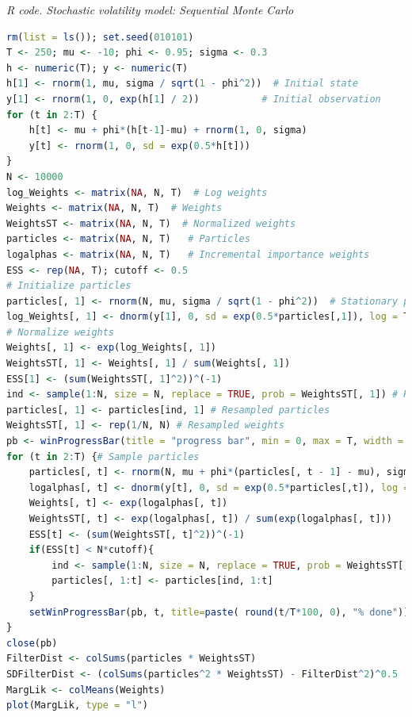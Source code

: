 \begin{enumerate}[leftmargin=*]
\begin{tcolorbox}[enhanced,width=4.67in,center upper,
	fontupper=\large\bfseries,drop shadow southwest,sharp corners]
	\textit{R code. Stochastic volatility model:  Sequential Monte Carlo}
	\begin{VF}
		\begin{lstlisting}[language=R]
rm(list = ls()); set.seed(010101)
T <- 250; mu <- -10; phi <- 0.95; sigma <- 0.3
h <- numeric(T); y <- numeric(T)
h[1] <- rnorm(1, mu, sigma / sqrt(1 - phi^2))  # Initial state
y[1] <- rnorm(1, 0, exp(h[1] / 2))           # Initial observation
for (t in 2:T) {
	h[t] <- mu + phi*(h[t-1]-mu) + rnorm(1, 0, sigma)
	y[t] <- rnorm(1, 0, sd = exp(0.5*h[t]))
}
N <- 10000
log_Weights <- matrix(NA, N, T)  # Log weights
Weights <- matrix(NA, N, T)  # Weights 
WeightsST <- matrix(NA, N, T)  # Normalized weights 
particles <- matrix(NA, N, T)   # Particles
logalphas <- matrix(NA, N, T)   # Incremental importance weights
ESS <- rep(NA, T); cutoff <- 0.5
# Initialize particles
particles[, 1] <- rnorm(N, mu, sigma / sqrt(1 - phi^2))  # Stationary prior
log_Weights[, 1] <- dnorm(y[1], 0, sd = exp(0.5*particles[,1]), log = TRUE)  # Likelihood
# Normalize weights
Weights[, 1] <- exp(log_Weights[, 1])
WeightsST[, 1] <- Weights[, 1] / sum(Weights[, 1])
ESS[1] <- (sum(WeightsST[, 1]^2))^(-1)
ind <- sample(1:N, size = N, replace = TRUE, prob = WeightsST[, 1]) # Resample 
particles[, 1] <- particles[ind, 1] # Resampled particles
WeightsST[, 1] <- rep(1/N, N) # Resampled weights
pb <- winProgressBar(title = "progress bar", min = 0, max = T, width = 300)
for (t in 2:T) {# Sample particles
	particles[, t] <- rnorm(N, mu + phi*(particles[, t - 1] - mu), sigma)  # Sample from proposal
	logalphas[, t] <- dnorm(y[t], 0, sd = exp(0.5*particles[,t]), log = TRUE) 
	Weights[, t] <- exp(logalphas[, t])
	WeightsST[, t] <- exp(logalphas[, t]) / sum(exp(logalphas[, t]))
	ESS[t] <- (sum(WeightsST[, t]^2))^(-1)
	if(ESS[t] < N*cutoff){
		ind <- sample(1:N, size = N, replace = TRUE, prob = WeightsST[, t])
		particles[, 1:t] <- particles[ind, 1:t]
	}
	setWinProgressBar(pb, t, title=paste( round(t/T*100, 0), "% done"))
}
close(pb)
FilterDist <- colSums(particles * WeightsST)
SDFilterDist <- (colSums(particles^2 * WeightsST) - FilterDist^2)^0.5
MargLik <- colMeans(Weights)
plot(MargLik, type = "l")
\end{lstlisting}
	\end{VF}
\end{tcolorbox} 
 


\end{enumerate}